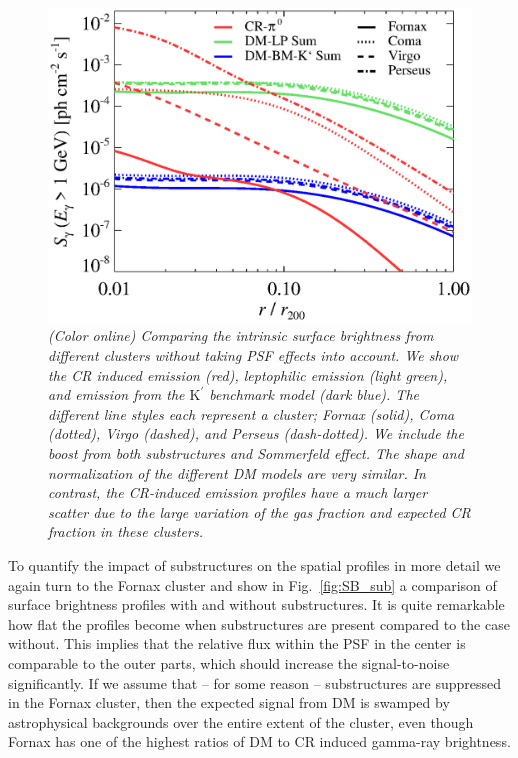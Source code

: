 \documentclass[10pt,aps,pra,reprint,amsmath,amsfonts,amssymb,showpacs,nofootinbib,floatfix]{revtex4-1}
\newcommand{\rmn}{\mathrm}
\newcommand{\Kp}{\rmn{K}^\prime}
\begin{document}
\begin{figure}
 \includegraphics[width=0.99\columnwidth]{figures/SB.v14.1GeV.SF700.SubMass.elmu.bw.eps}
 \caption{\it (Color online) Comparing the intrinsic surface
   brightness from different clusters without taking PSF effects into
   account. We show the CR induced emission (red), leptophilic
   emission (light green), and emission from the $\Kp$ benchmark model
   (dark blue). The different line styles each represent a cluster;
   Fornax (solid), Coma (dotted), Virgo (dashed), and Perseus
   (dash-dotted). We include the boost from both substructures and
   Sommerfeld effect. The shape and normalization of the different DM
   models are very similar. In contrast, the CR-induced emission
   profiles have a much larger scatter due to the large variation of
   the gas fraction and expected CR fraction in these clusters.}
 \label{fig:SB_clu}
\end{figure}

To quantify the impact of substructures on the spatial profiles in
more detail we again turn to the Fornax cluster and show in
Fig.~\ref{fig:SB_sub} a comparison of surface brightness profiles with
and without substructures. It is quite remarkable how flat the
profiles become when substructures are present compared to the case
without. This implies that the relative flux within the PSF in the
center is comparable to the outer parts, which should increase the
signal-to-noise significantly. If we assume that -- for
some reason -- substructures are suppressed in the Fornax cluster, then the expected
signal from DM is swamped by astrophysical backgrounds over the entire
extent of the cluster, even though Fornax has one of the highest
ratios of DM to CR induced gamma-ray brightness.
\end{document}
